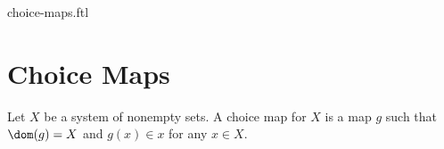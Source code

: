 \documentclass{naproche-library}
\begin{document}
\begin{smodule}{choice-maps.ftl}

  \section*{Choice Maps}

  \begin{definition*}[forthel,id=FOUNDATIONS_10_1352015487625913,printid]
    Let $X$ be a system of nonempty sets.
    A choice map for $X$ is a map $g$ such that $\dom(g) = X$ and $g(x) \in x$ for any $x \in X$.
  \end{definition*}
\end{smodule}
\end{document}

